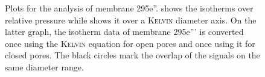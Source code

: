 \documentclass[../../../thesis.tex]{subfiles}
\begin{document}
\begin{figure}[tpb]
{
      \label{fig:295-e-200ald-kelvin}
    }
    \caption{Plots for the analysis of membrane 295e''. \protect{} shows the isotherms over relative pressure while \protect{} shows it over a \textsc{Kelvin} diameter axis. On the latter graph, the isotherm data of membrane 295e''' is converted once using the \textsc{Kelvin} equation for open pores and once using it for closed pores. The black circles mark the overlap of the signals on the same diameter range. }
    \label{fig:295e-200ald}
  \end{figure}
\end{document}
